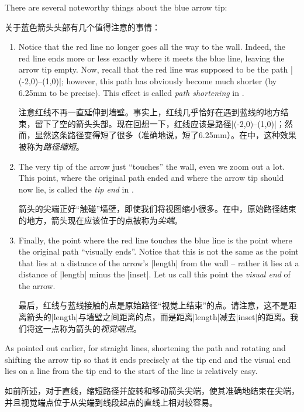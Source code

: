 There are several noteworthy things about the blue arrow tip:

关于蓝色箭头头部有几个值得注意的事情：
%
\begin{enumerate}
    \item Notice that the red line no longer goes all the way to the wall.
        Indeed, the red line ends more or less exactly where it meets the
        blue line, leaving the arrow tip empty. Now, recall that the red line
        was supposed to be the path |(-2,0)--(1,0)|; however, this path has
        obviously become much shorter (by 6.25mm to be precise). This effect
        is called \emph{path shortening} in \tikzname.

        注意红线不再一直延伸到墙壁。事实上，红线几乎恰好在遇到蓝线的地方结束，留下了空的箭头头部。现在回想一下，红线应该是路径|(-2,0)--(1,0)|；然而，显然这条路径变得短了很多（准确地说，短了6.25mm）。在\tikzname 中，这种效果被称为\emph{路径缩短}。
    \item The very tip of the arrow just ``touches'' the wall, even we zoom
        out a lot. This point, where the original path ended and where the
        arrow tip should now lie, is called the \emph{tip end} in \tikzname.

        箭头的尖端正好“触碰”墙壁，即使我们将视图缩小很多。在\tikzname 中，原始路径结束的地方，箭头现在应该位于的点被称为\emph{尖端}。
    \item Finally, the point where the red line touches the blue line is the
        point where the original path ``visually ends''. Notice that this is
        not the same as the point that lies at a distance of the arrow's
        |length| from the wall -- rather it lies at a distance of |length|
        minus the |inset|. Let us call this point the \emph{visual
    end} of the arrow.

    最后，红线与蓝线接触的点是原始路径“视觉上结束”的点。请注意，这不是距离箭头的|length|与墙壁之间距离的点，而是距离|length|减去|inset|的距离。我们将这一点称为箭头的\emph{视觉端点}。

\end{enumerate}

As pointed out earlier, for straight lines, shortening the path and rotating
and shifting the arrow tip so that it ends precisely at the tip end and the
visual end lies on a line from the tip end to the start of the line is
relatively easy.

如前所述，对于直线，缩短路径并旋转和移动箭头尖端，使其准确地结束在尖端，并且视觉端点位于从尖端到线段起点的直线上相对较容易。

